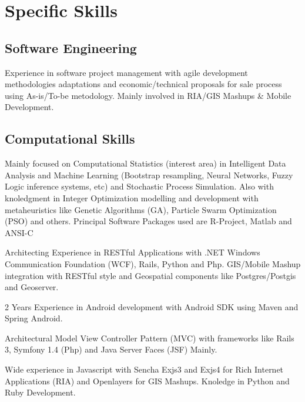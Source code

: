 \section{Specific Skills}
\subsection{Software Engineering}
	{Experience in software project management with agile development
methodologies adaptations and economic/technical proposals for sale process
using As-is/To-be metodology. Mainly involved in RIA/GIS Mashups \& Mobile Development.}
	
\subsection{Computational Skills}
	{Mainly focused on Computational Statistics (interest area) in Intelligent Data Analysis and Machine Learning (Bootstrap resampling, Neural Networks, Fuzzy Logic inference systems, etc)  and Stochastic Process Simulation. Also 
	with knoledgment in Integer Optimization modelling and development with metaheuristics like Genetic Algorithms (GA), Particle Swarm Optimization (PSO) and others. Principal Software Packages used are R-Project, Matlab and ANSI-C}

	{Architecting Experience in RESTful Applications with .NET Windows Communication Foundation (WCF), Rails, Python and Php. GIS/Mobile Mashup integration with RESTful style and Geospatial components like Postgres/Postgis and Geoserver.  }

	{2 Years Experience in Android development with Android SDK using Maven and Spring Android.}

	{Architectural Model View Controller Pattern (MVC) with frameworks like Rails 3, Symfony 1.4 (Php) and Java Server Faces (JSF) Mainly.}

	{Wide experience in Javascript with Sencha Exjs3 and Exjs4 for Rich Internet Applications (RIA) and Openlayers for GIS Mashups. Knoledge in Python and Ruby Development.}

	

	



